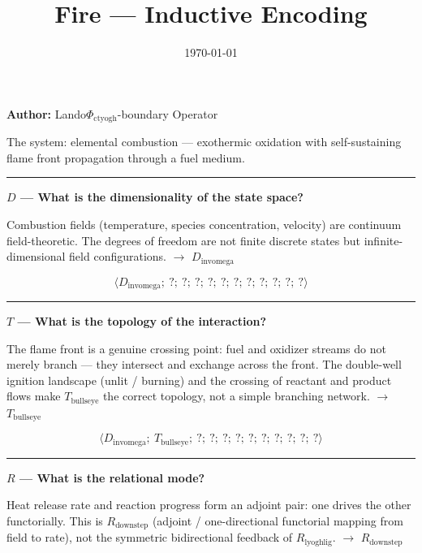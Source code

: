 \documentclass[12pt,a4paper]{article}
\begin{document}
\title{Fire --- Inductive Encoding}
\date{\today}

\maketitle

\textbf{Author:} Lando\otimes$\Phi_{\text{ctyogh}}$-boundary Operator

The system: elemental combustion --- exothermic oxidation with self-sustaining flame front propagation through a fuel medium.

\begin{center}
\rule{0.5\textwidth}{0.4pt}
\end{center}

\textbf{$D$ --- What is the dimensionality of the state space?}

Combustion fields (temperature, species concentration, velocity) are continuum field-theoretic. The degrees of freedom are not finite discrete states but infinite-dimensional field configurations. $\rightarrow$ $D_{\text{invomega}}$

\[\langle D_{\text{invomega}};\ ?;\ ?;\ ?;\ ?;\ ?;\ ?;\ ?;\ ?;\ ?;\ ?;\ ? \rangle\]

\begin{center}
\rule{0.5\textwidth}{0.4pt}
\end{center}

\textbf{$T$ --- What is the topology of the interaction?}

The flame front is a genuine crossing point: fuel and oxidizer streams do not merely branch --- they intersect and exchange across the front. The double-well ignition landscape (unlit / burning) and the crossing of reactant and product flows make $T_{\text{bullseye}}$ the correct topology, not a simple branching network. $\rightarrow$ $T_{\text{bullseye}}$

\[\langle D_{\text{invomega}};\ T_{\text{bullseye}};\ ?;\ ?;\ ?;\ ?;\ ?;\ ?;\ ?;\ ?;\ ?;\ ? \rangle\]

\begin{center}
\rule{0.5\textwidth}{0.4pt}
\end{center}

\textbf{$R$ --- What is the relational mode?}

Heat release rate and reaction progress form an adjoint pair: one drives the other functorially. This is $R_{\text{downstep}}$ (adjoint / one-directional functorial mapping from field to rate), not the symmetric bidirectional feedback of $R_{\text{lyoghlig}}$. $\rightarrow$ $R_{\text{downstep}}$
\end{document}
